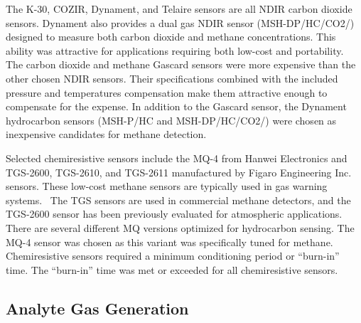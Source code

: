 \documentclass[times]{joehreview}
\begin{document}
	The K-30, COZIR, Dynament, and Telaire sensors are all NDIR carbon dioxide sensors.  Dynament also provides a dual gas NDIR sensor (MSH-DP/HC/CO2/) designed to measure both carbon dioxide and methane concentrations. This ability was attractive for applications requiring both low-cost and portability.  The carbon dioxide and methane Gascard sensors were more expensive than the other chosen NDIR sensors.  Their specifications combined with the included pressure and temperatures compensation make them attractive enough to compensate for the expense. In addition to the Gascard sensor, the Dynament hydrocarbon sensors (MSH-P/HC and MSH-DP/HC/CO2/) were chosen as inexpensive candidates for methane detection.
	
	Selected chemiresistive sensors include the MQ-4 from Hanwei Electronics and TGS-2600, TGS-2610, and TGS-2611 manufactured by Figaro Engineering Inc. sensors.  These low-cost methane sensors are typically used in gas warning systems.~\cite{chiu_towards_2013}  The TGS sensors are used in commercial methane detectors, and the TGS-2600 sensor has been previously evaluated for atmospheric applications.~\cite{eugster_performance_2012,bossche_potential_2017}  There are several different MQ versions optimized for hydrocarbon sensing.  The MQ-4 sensor was chosen as this variant was specifically tuned for methane.  Chemiresistive sensors required a minimum conditioning period or ``burn-in'' time.  The ``burn-in'' time was met or exceeded for all chemiresistive sensors.  
	
	\subsection*{Analyte Gas Generation}
	\label{sec:method_gas}
	
\end{document}
